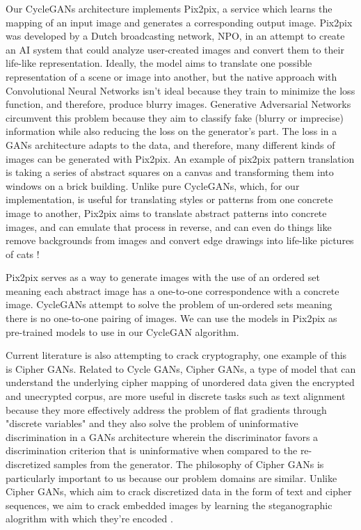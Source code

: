 \documentclass[conference]{IEEEtran}
\begin{document}
Our CycleGANs architecture implements Pix2pix, a service which learns the mapping of an input image and generates a corresponding output image. Pix2pix was developed by a Dutch broadcasting network, NPO, in an attempt to create an AI system that could analyze user-created images and convert them to their life-like representation. Ideally, the model aims to translate one possible representation of a scene or image into another, but the native approach with Convolutional Neural Networks isn't ideal because they train to minimize the loss function, and therefore, produce blurry images. Generative Adversarial Networks circumvent this problem because they aim to classify fake (blurry or imprecise) information while also reducing the loss on the generator's part. The loss in a GANs architecture adapts to the data, and therefore, many different kinds of images can be generated with Pix2pix. An example of pix2pix pattern translation is taking a series of abstract squares on a canvas and transforming them into windows on a brick building. Unlike pure CycleGANs, which, for our implementation, is useful for translating styles or patterns from one concrete image to another, Pix2pix aims to translate abstract patterns into concrete images, and can emulate that process in reverse, and can even do things like remove backgrounds from images and convert edge drawings into life-like pictures of cats \cite{isola_image--image_2018}!

Pix2pix serves as a way to generate images with the use of an ordered set meaning each abstract image has a one-to-one correspondence with a concrete image. CycleGANs attempt to solve the problem of un-ordered sets meaning there is no one-to-one pairing of images. We can use the models in Pix2pix as pre-trained models to use in our CycleGAN algorithm.

Current literature is also attempting to crack cryptography, one example of this is Cipher GANs. Related to Cycle GANs, Cipher GANs, a type of model that can understand the underlying cipher mapping of unordered data given the encrypted and unecrypted corpus, are more useful in discrete tasks such as text alignment because they more effectively address the problem of flat gradients through "discrete variables" and they also solve the problem of uninformative discrimination in a GANs architecture wherein the discriminator favors a discrimination criterion that is uninformative when compared to the re-discretized samples from the generator. The philosophy of Cipher GANs is particularly important to us because our problem domains are similar. Unlike Cipher GANs, which aim to crack discretized data in the form of text and cipher sequences, we aim to crack embedded images by learning the steganographic alogrithm with which they're encoded \cite{gomez_unsupervised_2018}.
\end{document}
